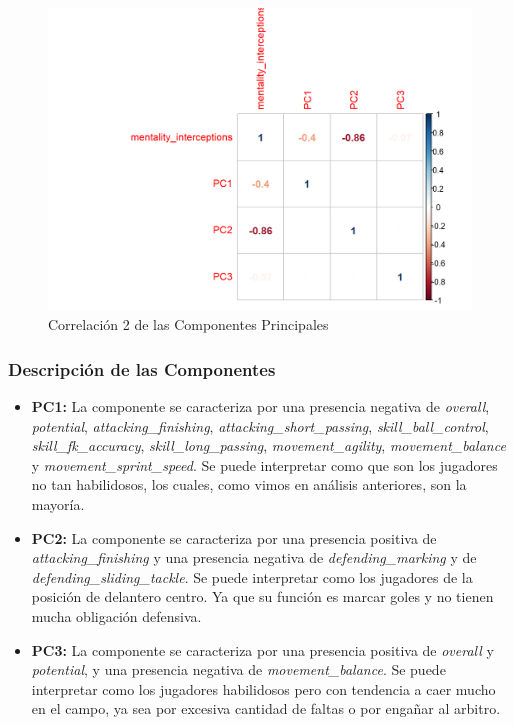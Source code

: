 \documentclass[a4paper,10pt,twocolumn]{article}
\begin{document}
\begin{figure}[htb]%
	\begin{center}
		\includegraphics[width=\linewidth]{cor_acp_2}
	\end{center}
	\caption{Correlación 2 de las Componentes Principales \label{fig:cor_acp_2}}%
\end{figure}

\subsubsection{Descripción de las Componentes}\label{sec:desc_comp}

\begin{itemize}
	\item \textbf{PC1:} La componente se caracteriza por una presencia negativa de \textit{overall}, \textit{potential}, \textit{attacking\_finishing}, \textit{attacking\_short\_passing}, \textit{skill\_ball\_control}, \textit{skill\_fk\_accuracy}, \textit{skill\_long\_passing}, \textit{movement\_agility}, \textit{movement\_balance} y \textit{movement\_sprint\_speed}. Se puede interpretar como que son los jugadores no tan habilidosos, los cuales, como vimos en análisis anteriores, son la mayoría.

	\item \textbf{PC2:} La componente se caracteriza por una presencia positiva de \textit{attacking\_finishing} y una presencia negativa de \textit{defending\_marking} y de \textit{defending\_sliding\_tackle}. Se puede interpretar como los jugadores de la posición de delantero centro. Ya que su función es marcar goles y no tienen mucha obligación defensiva.

	\item \textbf{PC3:} La componente se caracteriza por una presencia positiva de \textit{overall} y \textit{potential}, y una presencia negativa de \textit{movement\_balance}. Se puede interpretar como los jugadores habilidosos pero con tendencia a caer mucho en el campo, ya sea por excesiva cantidad de faltas o por engañar al arbitro.
\end{itemize}
\end{document}

